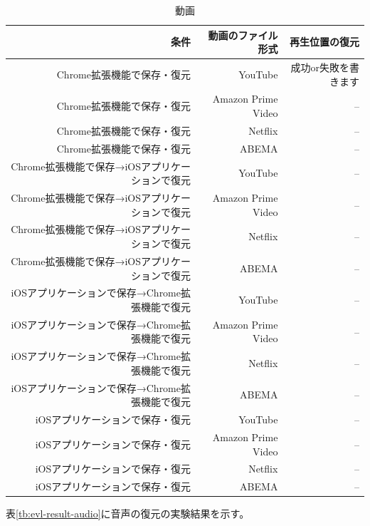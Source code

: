 \begin{table}[htbp]
  \caption{動画}
  \label{tb:evl-result-video}
  \begin{center}
    \begin{tabular}{rrr}
      \hline
      条件 & 動画のファイル形式 & 再生位置の復元 \\ \hline \hline
      Chrome拡張機能で保存・復元 & YouTube & 成功or失敗を書きます  \\ \hline
      Chrome拡張機能で保存・復元 & Amazon Prime Video & --  \\ \hline
      Chrome拡張機能で保存・復元 & Netflix & --  \\ \hline
      Chrome拡張機能で保存・復元 & ABEMA & --  \\ \hline
      Chrome拡張機能で保存→iOSアプリケーションで復元 & YouTube & --  \\ \hline
      Chrome拡張機能で保存→iOSアプリケーションで復元 & Amazon Prime Video & --  \\ \hline
      Chrome拡張機能で保存→iOSアプリケーションで復元 & Netflix & --  \\ \hline
      Chrome拡張機能で保存→iOSアプリケーションで復元 & ABEMA & --  \\ \hline
      iOSアプリケーションで保存→Chrome拡張機能で復元 & YouTube & --  \\ \hline
      iOSアプリケーションで保存→Chrome拡張機能で復元 & Amazon Prime Video & --  \\ \hline
      iOSアプリケーションで保存→Chrome拡張機能で復元 & Netflix & --  \\ \hline
      iOSアプリケーションで保存→Chrome拡張機能で復元 & ABEMA & --  \\ \hline
      iOSアプリケーションで保存・復元 & YouTube & --  \\ \hline
      iOSアプリケーションで保存・復元 & Amazon Prime Video & --  \\ \hline
      iOSアプリケーションで保存・復元 & Netflix & --  \\ \hline
      iOSアプリケーションで保存・復元 & ABEMA & --  \\ \hline
    \end{tabular}
  \end{center}
\end{table}

表\ref{tb:evl-result-audio}に音声の復元の実験結果を示す。

